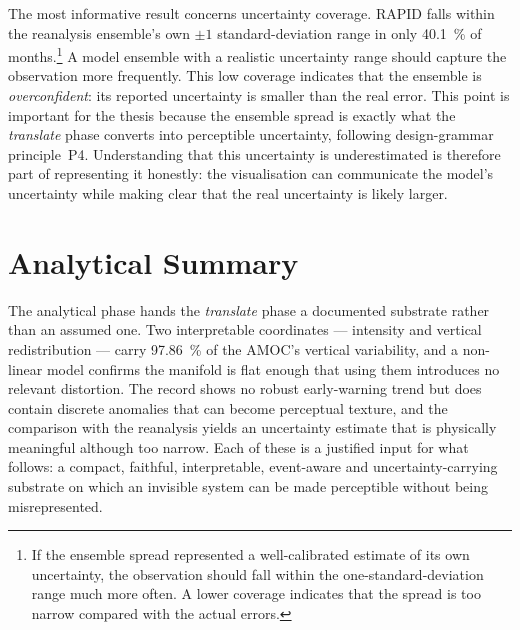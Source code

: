 The most informative result concerns uncertainty coverage. RAPID falls within the reanalysis ensemble's own $\pm1$ standard-deviation range in only \SI{40.1}{\percent} of months.\footnote{If the ensemble spread represented a well-calibrated estimate of its own uncertainty, the observation should fall within the one-standard-deviation range much more often. A lower coverage indicates that the spread is too narrow compared with the actual errors.} A model ensemble with a realistic uncertainty range should capture the observation more frequently. This low coverage indicates that the ensemble is \emph{overconfident}: its reported uncertainty is smaller than the real error. This point is important for the thesis because the ensemble spread is exactly what the \emph{translate} phase converts into perceptible uncertainty, following design-grammar principle~P4. Understanding that this uncertainty is underestimated is therefore part of representing it honestly: the visualisation can communicate the model's uncertainty while making clear that the real uncertainty is likely larger.

\section{Analytical Summary}
\label{sec:detect-summary}

The analytical phase hands the \emph{translate} phase a documented substrate rather than an assumed one. Two interpretable coordinates --- intensity and vertical redistribution --- carry \SI{97.86}{\percent} of the AMOC's vertical variability, and a non-linear model confirms the manifold is flat enough that using them introduces no relevant distortion. The record shows no robust early-warning trend but does contain discrete anomalies that can become perceptual texture, and the comparison with the reanalysis yields an uncertainty estimate that is physically meaningful although too narrow. Each of these is a justified input for what follows: a compact, faithful, interpretable, event-aware and uncertainty-carrying substrate on which an invisible system can be made perceptible without being misrepresented.